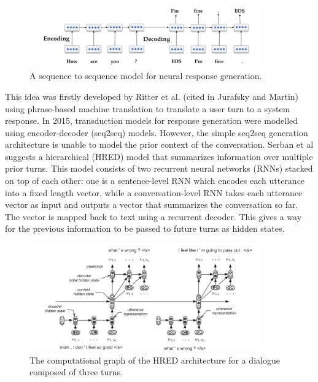 \documentclass[bsc,frontabs,twoside,singlespacing,parskip,deptreport]{infthesis}     %
\begin{document}
\begin{figure}[h]
    \centering
    \includegraphics[width=0.9\textwidth]{seq2seq.jpeg}
    \caption{A sequence to sequence model for neural response generation.\cite{jurafsky2019speech}}
    \label{fig:seq2seq}
\end{figure}

This idea was firstly developed by Ritter et al\cite{ritter2011data}. (cited in Jurafsky and Martin\cite{jurafsky2019speech}) using phrase-based machine translation to translate a user turn to a system response. In 2015, transduction models for response generation were modelled using encoder-decoder (seq2seq) models\cite{shang2015neural,strub2017end,sordoni2015neural}. However, the simple seq2seq generation architecture is unable to model the prior context of the conversation. Serban et al\cite{serban2016building} suggests a hierarchical (HRED) model that summarizes information over multiple prior turns. This model consists of two recurrent neural networks (RNNs) stacked on top of each other: one is a sentence-level RNN which encodes each utterance into a fixed length vector, while a conversation-level RNN takes each utterance vector as input and outputs a vector that summarizes the conversation so far. The vector is mapped back to text using a recurrent decoder. This gives a way for the previous information to be passed to future turns as hidden states\cite{lowe2017training}.

\begin{figure}[h]
    \centering
    \includegraphics[width=0.9\textwidth]{HERD.jpeg}
    \caption{The computational graph of the HRED architecture for a dialogue composed of three turns.}
    \label{fig:HERD}
\end{figure}
\end{document}
